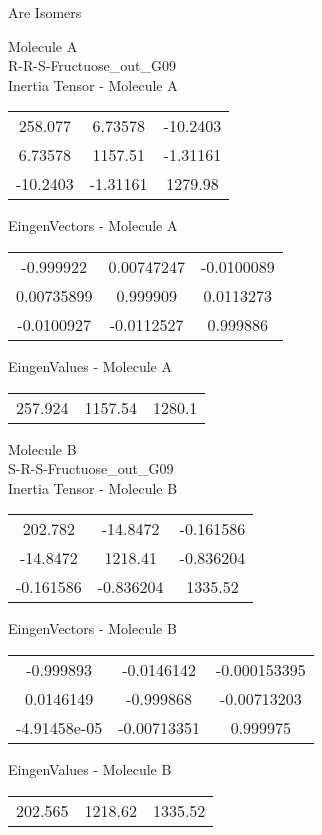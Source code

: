 \begin{center}
\vtab
\vtab
\textcolor{NavyBlue}{\Large Are Isomers}
\end{center}
\newpage
\begin{multicols}{2}
\begin{center}
Molecule A \\ 
R-R-S-Fructuose\_out\_G09
\\
Inertia Tensor - Molecule A \\
\vtab
\begin{tabular}{|c c c|}
258.077	 & 	6.73578	 & 	-10.2403	 \\
6.73578	 & 	1157.51	 & 	-1.31161	 \\
-10.2403	 & 	-1.31161	 & 	1279.98
\end{tabular}

\vtab
 EingenVectors - Molecule A     \\
\vtab
\begin{tabular}{|c c c|}
-0.999922	 & 	0.00747247	 & 	-0.0100089	 \\
0.00735899	 & 	0.999909	 & 	0.0113273	 \\
-0.0100927	 & 	-0.0112527	 & 	0.999886
\end{tabular}

\vtab
 EingenValues - Molecule A     \\
\vtab
\begin{tabular}{|c c c|}
257.924	 & 	1157.54	 & 	1280.1
\end{tabular}
\columnbreak

Molecule B \\ 
S-R-S-Fructuose\_out\_G09
\\
Inertia Tensor - Molecule B \\
\vtab
\begin{tabular}{|c c c|}
202.782	 & 	-14.8472	 & 	-0.161586	 \\
-14.8472	 & 	1218.41	 & 	-0.836204	 \\
-0.161586	 & 	-0.836204	 & 	1335.52
\end{tabular}

\vtab
 EingenVectors - Molecule B     \\
\vtab
\begin{tabular}{|c c c|}
-0.999893	 & 	-0.0146142	 & 	-0.000153395	 \\
0.0146149	 & 	-0.999868	 & 	-0.00713203	 \\
-4.91458e-05	 & 	-0.00713351	 & 	0.999975
\end{tabular}

\vtab
 EingenValues - Molecule B     \\
\vtab
\begin{tabular}{|c c c|}
202.565	 & 	1218.62	 & 	1335.52
\end{tabular}

\end{center}
\end{multicols}
